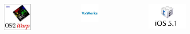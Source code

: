 \documentclass[compress=true]{beamer}
\begin{document}
\begin{frame}
\begin{itemize}
\begin{columns}
\begin{column}{0.2\textwidth}
\begin{figure}
					\end{figure}
				\end{column}
				\begin{column}{0.2\textwidth}
					\begin{figure}
						\includegraphics[height=0.15\textheight]{os2.png}
					\end{figure}
				\end{column}
				\begin{column}{0.2\textwidth}
					\begin{figure}
						\includegraphics[height=0.15\textheight]{vxworks.png}
					\end{figure}
				\end{column}
				\begin{column}{0.2\textwidth}
					\begin{figure}
						\includegraphics[height=0.15\textheight]{ios.png}
					\end{figure}
				\end{column}

			\end{columns}
	\end{itemize}
\end{frame}
\end{document}
